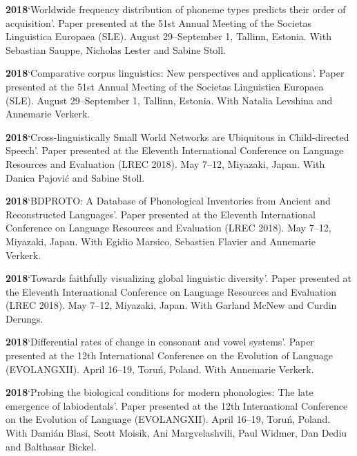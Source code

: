\documentclass[11pt]{article}
\newcommand{\hangpara}{
 \setlength{\parindent}{0in} %
 \hangindent=0.42in %
}
\begin{document}
\vskip 6pt
\hangpara
{\bf 2018}\hspace{1ex}`Worldwide frequency distribution of phoneme types predicts their order of acquisition'. Paper presented at the 51st Annual Meeting of the Societas Linguistica Europaea (SLE). August 29--September 1, Tallinn, Estonia. With Sebastian Sauppe, Nicholas Lester and Sabine Stoll.

\vskip 6pt
\hangpara
{\bf 2018}\hspace{1ex}`Comparative corpus linguistics: New perspectives and applications'. Paper presented at the 51st Annual Meeting of the Societas Linguistica Europaea (SLE). August 29--September 1, Tallinn, Estonia. With Natalia Levshina and Annemarie Verkerk.

\vskip 6pt
\hangpara
{\bf 2018}\hspace{1ex}`Cross-linguistically Small World Networks are Ubiquitous in Child-directed Speech'. Paper presented at the Eleventh International Conference on Language Resources and Evaluation (LREC 2018). May 7--12, Miyazaki, Japan. With Danica Pajovi{\'c} and Sabine Stoll.

\vskip 6pt
\hangpara
{\bf 2018}\hspace{1ex}`BDPROTO: A Database of Phonological Inventories from Ancient and Reconstructed Languages'. Paper presented at the Eleventh International Conference on Language Resources and Evaluation (LREC 2018). May 7--12, Miyazaki, Japan. With Egidio Marsico, Sebastien Flavier and Annemarie Verkerk.

\vskip 6pt
\hangpara
{\bf 2018}\hspace{1ex}`Towards faithfully visualizing global linguistic diversity'. Paper presented at the Eleventh International Conference on Language Resources and Evaluation (LREC 2018). May 7--12, Miyazaki, Japan. With Garland McNew and Curdin Derungs.

\vskip 6pt
\hangpara
{\bf 2018}\hspace{1ex}`Differential rates of change in consonant and vowel systems'. Paper presented at the 12th International Conference on the Evolution of Language (EVOLANGXII). April 16--19, Toru{\'n}, Poland. With Annemarie Verkerk. %

\vskip 6pt
\hangpara
{\bf 2018}\hspace{1ex}`Probing the biological conditions for modern phonologies: The late emergence of labiodentals'. Paper presented at the 12th International Conference on the Evolution of Language (EVOLANGXII). April 16--19, Toru{\'n}, Poland. With Dami{\'a}n Blasi, Scott Moisik, Ani Margvelashvili, Paul Widmer, Dan Dediu and Balthasar Bickel.
\end{document}
